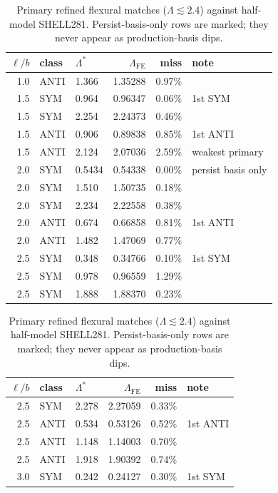 \documentclass[11pt]{article}
\begin{document}
\begin{table}[!htbp]\centering\scriptsize
\caption{Primary refined flexural matches ($\Lambda\lesssim 2.4$) against
half-model SHELL281. Persist-basis-only rows are marked; they never
appear as production-basis dips.}
\label{tab:oop-primary}
\setlength{\tabcolsep}{3pt}
\noindent\begin{minipage}[t]{0.49\textwidth}
\begin{tabularx}{\linewidth}{@{}rllrrX@{}}
\toprule
$\ell/b$ & class & $\Lambda^{*}$ & $\Lambda_{\mathrm{FE}}$ & miss & note \\
\midrule
1.0 & ANTI & 1.366 & 1.35288 & 0.97\% & \\
1.5 & SYM  & 0.964 & 0.96347 & 0.06\% & 1st SYM \\
1.5 & SYM  & 2.254 & 2.24373 & 0.46\% & \\
1.5 & ANTI & 0.906 & 0.89838 & 0.85\% & 1st ANTI \\
1.5 & ANTI & 2.124 & 2.07036 & 2.59\% & weakest primary \\
2.0 & SYM  & 0.5434 & 0.54338 & 0.00\% & persist basis only \\
2.0 & SYM  & 1.510 & 1.50735 & 0.18\% & \\
2.0 & SYM  & 2.234 & 2.22558 & 0.38\% & \\
2.0 & ANTI & 0.674 & 0.66858 & 0.81\% & 1st ANTI \\
2.0 & ANTI & 1.482 & 1.47069 & 0.77\% & \\
2.5 & SYM  & 0.348 & 0.34766 & 0.10\% & 1st SYM \\
2.5 & SYM  & 0.978 & 0.96559 & 1.29\% & \\
2.5 & SYM  & 1.888 & 1.88370 & 0.23\% & \\
\bottomrule
\end{tabularx}
\end{minipage}\hfill
\begin{minipage}[t]{0.49\textwidth}
\begin{tabularx}{\linewidth}{@{}rllrrX@{}}
\toprule
$\ell/b$ & class & $\Lambda^{*}$ & $\Lambda_{\mathrm{FE}}$ & miss & note \\
\midrule
2.5 & SYM  & 2.278 & 2.27059 & 0.33\% & \\
2.5 & ANTI & 0.534 & 0.53126 & 0.52\% & 1st ANTI \\
2.5 & ANTI & 1.148 & 1.14003 & 0.70\% & \\
2.5 & ANTI & 1.918 & 1.90392 & 0.74\% & \\
3.0 & SYM  & 0.242 & 0.24127 & 0.30\% & 1st SYM \\

\end{tabularx}
\end{minipage}
\end{table}
\end{document}
